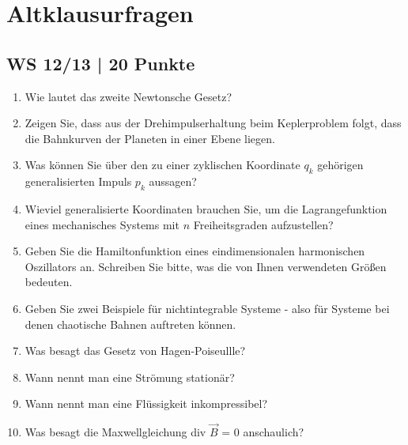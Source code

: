 \section{Altklausurfragen}
\subsection{WS 12/13 | 20 Punkte}
\begin{enumerate}
    \item Wie lautet das zweite Newtonsche Gesetz?
    \item Zeigen Sie, dass aus der Drehimpulserhaltung beim Keplerproblem folgt, dass die Bahnkurven der Planeten in einer Ebene liegen.
    \item Was können Sie über den zu einer zyklischen Koordinate $q_k$ gehörigen generalisierten Impuls $p_k$ aussagen?
    \item Wieviel generalisierte Koordinaten brauchen Sie, um die Lagrangefunktion eines mechanisches Systems mit $n$ Freiheitsgraden aufzustellen?
    \item Geben Sie die Hamiltonfunktion eines eindimensionalen harmonischen Oszillators an. Schreiben Sie bitte, was die von Ihnen verwendeten Größen bedeuten.
    \item Geben Sie zwei Beispiele für nichtintegrable Systeme - also für Systeme bei denen chaotische Bahnen auftreten können.
    \item Was besagt das Gesetz von Hagen-Poiseullle?
    \item Wann nennt man eine Strömung stationär?
    \item Wann nennt man eine Flüssigkeit inkompressibel?
    \item Was besagt die Maxwellgleichung div $\vec{B}$ = 0 anschaulich?    
\end{enumerate}
